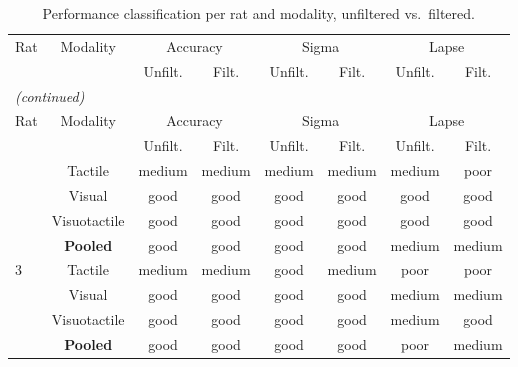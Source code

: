 \begin{longtable}{lccccccc}
\caption{Performance classification per rat and modality, unfiltered vs.\ filtered.}
\label{tab:s1-classification} \\
\toprule
Rat & Modality & \multicolumn{2}{c}{Accuracy} & \multicolumn{2}{c}{Sigma} & \multicolumn{2}{c}{Lapse} \\
 &  & Unfilt. & Filt. & Unfilt. & Filt. & Unfilt. & Filt. \\
\midrule
\endfirsthead
\multicolumn{8}{l}{\textit{(continued)}} \\
\toprule
Rat & Modality & \multicolumn{2}{c}{Accuracy} & \multicolumn{2}{c}{Sigma} & \multicolumn{2}{c}{Lapse} \\
 &  & Unfilt. & Filt. & Unfilt. & Filt. & Unfilt. & Filt. \\
\midrule
\endhead
\bottomrule
\endfoot
\bottomrule
\endlastfoot
2 & Tactile & \cellcolor{yellow!25}medium & \cellcolor{yellow!25}medium & \cellcolor{yellow!25}medium & \cellcolor{yellow!25}medium & \cellcolor{yellow!25}medium & \cellcolor{red!15}poor \\
 & Visual & \cellcolor{green!15}good & \cellcolor{green!15}good & \cellcolor{green!15}good & \cellcolor{green!15}good & \cellcolor{green!15}good & \cellcolor{green!15}good \\
 & Visuotactile & \cellcolor{green!15}good & \cellcolor{green!15}good & \cellcolor{green!15}good & \cellcolor{green!15}good & \cellcolor{green!15}good & \cellcolor{green!15}good \\
\textbf{} & \textbf{Pooled} & \cellcolor{green!15}good & \cellcolor{green!15}good & \cellcolor{green!15}good & \cellcolor{green!15}good & \cellcolor{yellow!25}medium & \cellcolor{yellow!25}medium \\
3 & Tactile & \cellcolor{yellow!25}medium & \cellcolor{yellow!25}medium & \cellcolor{green!15}good & \cellcolor{yellow!25}medium & \cellcolor{red!15}poor & \cellcolor{red!15}poor \\
 & Visual & \cellcolor{green!15}good & \cellcolor{green!15}good & \cellcolor{green!15}good & \cellcolor{green!15}good & \cellcolor{yellow!25}medium & \cellcolor{yellow!25}medium \\
 & Visuotactile & \cellcolor{green!15}good & \cellcolor{green!15}good & \cellcolor{green!15}good & \cellcolor{green!15}good & \cellcolor{yellow!25}medium & \cellcolor{green!15}good \\
\textbf{} & \textbf{Pooled} & \cellcolor{green!15}good & \cellcolor{green!15}good & \cellcolor{green!15}good & \cellcolor{green!15}good & \cellcolor{red!15}poor & \cellcolor{yellow!25}medium \\

\end{longtable}
